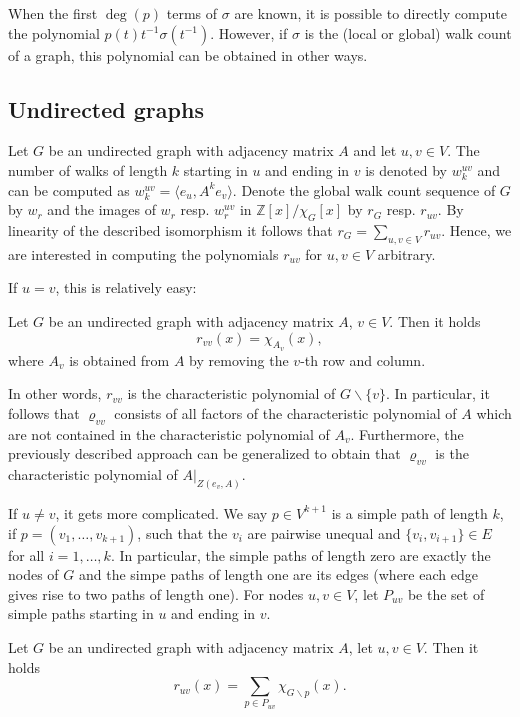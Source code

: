 \documentclass[a4paper,12pt]{article}
\begin{document}
When the first $\deg(p)$ terms of $\sigma$ are known, it is possible to directly compute the polynomial $p(t) t^{-1} \sigma\left(t^{-1}\right)$. However, if $\sigma$ is the (local or global) walk count of a graph, this polynomial can be obtained in other ways.

\subsection{Undirected graphs}

Let $G$ be an undirected graph with adjacency matrix $A$ and let $u,v \in V$. The number of walks of length $k$ starting in $u$ and ending in $v$ is denoted by $w_k^{uv}$ and can be computed as $w_k^{uv} = \langle e_u,A^ke_v\rangle$. Denote the global walk count sequence of $G$ by $w_r$ and the images of $w_r$ resp. $w_r^{uv}$ in $\mathbb{Z}[x]/\chi_G[x]$ by $r_G$ resp. $r_{uv}$. By linearity of the described isomorphism it follows that $r_G = \sum_{u,v\in V}r_{uv}$. Hence, we are interested in computing the polynomials $r_{uv}$ for $u,v\in V$ arbitrary.

If $u=v$, this is relatively easy:

\begin{claim}\label{cl:closed_walks}
Let $G$ be an undirected graph with adjacency matrix $A$, $v\in V$. Then it holds
$$
r_{vv}(x) = \chi_{A_v}(x),
$$
where $A_v$ is obtained from $A$ by removing the $v$-th row and column.
\end{claim}

In other words, $r_{vv}$ is the characteristic polynomial of $G\backslash\{v\}$. In particular, it follows that $\varrho_{vv}$ consists of all factors of the characteristic polynomial of $A$ which are not contained in the characteristic polynomial of $A_v$. Furthermore, the previously described approach can be generalized to obtain that $\varrho_{vv}$ is the characteristic polynomial of $A|_{Z(e_v,A)}$.

If $u\neq v$, it gets more complicated. We say $p \in V^{k+1}$ is a simple path of length $k$, if $p = (v_1, \ldots, v_{k+1})$, such that the $v_i$ are pairwise unequal and $\{v_i,v_{i+1}\} \in E$ for all $i=1, \ldots, k$. In particular, the simple paths of length zero are exactly the nodes of $G$ and the simpe paths of length one are its edges (where each edge gives rise to two paths of length one). For nodes $u,v\in V$, let $P_{uv}$ be the set of simple paths starting in $u$ and ending in $v$.

\begin{claim}\label{cl:local_walks}
Let $G$ be an undirected graph with adjacency matrix $A$, let $u,v\in V$. Then it holds
$$
r_{uv}(x) = \sum_{p\in P_{uv}} \chi_{G\backslash p}(x).
$$
\end{claim}
\end{document}
